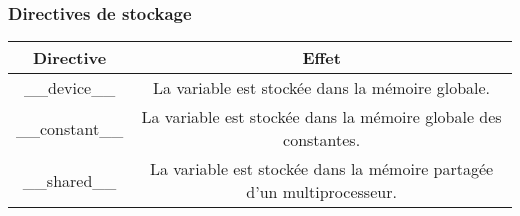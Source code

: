 \begin{frame}
    \frametitle{Directives de stockage}
    \renewcommand{\arraystretch}{2}
    \begin{tabular}{|c|c|}
        \hline
        \rowcolor{lightgray} Directive & Effet \\ \hline
        \_\_device\_\_ & \begin{minipage}{0.8\textwidth}
            La variable est stockée dans la mémoire globale. 
        \end{minipage} \\ \hline
        \_\_constant\_\_ & \begin{minipage}{0.8\textwidth}
            La variable est stockée dans la mémoire globale des constantes.
        \end{minipage} \\ \hline
        \_\_shared\_\_ & \begin{minipage}{0.8\textwidth}
            La variable est stockée dans la mémoire partagée d'un multiprocesseur.
        \end{minipage} \\ \hline
    \end{tabular}
\end{frame}

